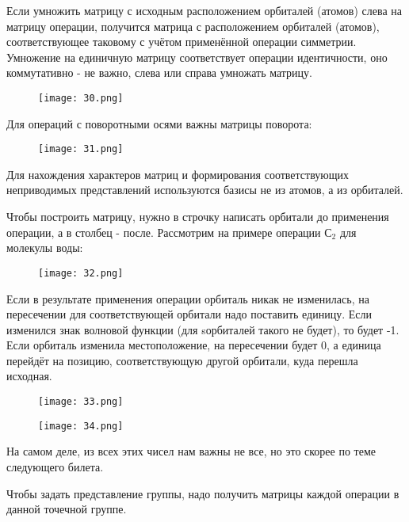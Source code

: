 	\par\smallskip
	
	
	Если умножить матрицу с исходным расположением орбиталей
	(атомов) слева на матрицу операции, получится матрица с
	расположением орбиталей (атомов), соответствующее таковому с
	учётом применённой операции симметрии. Умножение на
	единичную матрицу соответствует операции идентичности, оно
	коммутативно - не важно, слева или справа умножать матрицу.
	
	\begin{figure}[H]
		\centering
		{\texttt{[image: 30.png]}}
	\end{figure}
	
	Для операций с поворотными осями важны матрицы поворота:
	
	\begin{figure}[H]
		\centering
		{\texttt{[image: 31.png]}}
	\end{figure}
	
	
	Для нахождения характеров матриц и формирования
	соответствующих неприводимых представлений используются
	базисы не из атомов, а из орбиталей.
	
	\par\smallskip
	
	Чтобы построить матрицу, нужно в строчку написать орбитали до
	применения операции, а в столбец - после. Рассмотрим на примере
	операции $С_2$ для молекулы воды:
	
		\begin{figure}[H]
		\centering
		{\texttt{[image: 32.png]}}
	\end{figure}
	

	Если в результате применения операции орбиталь никак не
	изменилась, на пересечении для соответствующей орбитали надо
	поставить единицу. Если изменился знак волновой функции (для sорбиталей такого не будет), то будет -1. Если орбиталь изменила
	местоположение, на пересечении будет 0, а единица перейдёт на
	позицию, соответствующую другой орбитали, куда перешла
	исходная.
	
		\begin{figure}[H]
		\centering
		{\texttt{[image: 33.png]}}
	\end{figure}
	
		\begin{figure}[H]
		\centering
		{\texttt{[image: 34.png]}}
	\end{figure}
	
	
	На самом деле, из всех этих чисел нам важны не все, но это скорее по
	теме следующего билета.
	
	\par\smallskip
	
	Чтобы задать представление группы, надо получить матрицы каждой
	операции в данной точечной группе.
	
	\par\bigskip
	\par\bigskip
	